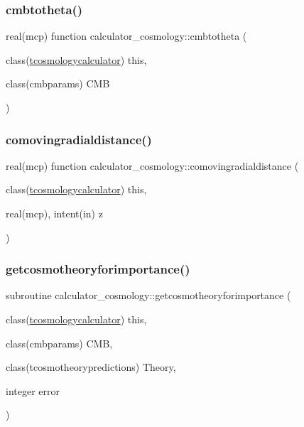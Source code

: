 \subsubsection{\texorpdfstring{cmbtotheta()}{cmbtotheta()}}
{\footnotesize\ttfamily real(mcp) function calculator\+\_\+cosmology\+::cmbtotheta (\begin{DoxyParamCaption}\item[{class(\mbox{\hyperlink{structcalculator__cosmology_1_1tcosmologycalculator}{tcosmologycalculator}})}]{this,  }\item[{class(cmbparams)}]{C\+MB }\end{DoxyParamCaption})\hspace{0.3cm}{\ttfamily [private]}}

\mbox{\label{namespacecalculator__cosmology_a56ce70cf463f7c6df9c6d59a9459b993}} 
\subsubsection{\texorpdfstring{comovingradialdistance()}{comovingradialdistance()}}
{\footnotesize\ttfamily real(mcp) function calculator\+\_\+cosmology\+::comovingradialdistance (\begin{DoxyParamCaption}\item[{class(\mbox{\hyperlink{structcalculator__cosmology_1_1tcosmologycalculator}{tcosmologycalculator}})}]{this,  }\item[{real(mcp), intent(in)}]{z }\end{DoxyParamCaption})\hspace{0.3cm}{\ttfamily [private]}}

\mbox{\label{namespacecalculator__cosmology_a520171f2409b797206b45a9b2f25ac22}} 
\subsubsection{\texorpdfstring{getcosmotheoryforimportance()}{getcosmotheoryforimportance()}}
{\footnotesize\ttfamily subroutine calculator\+\_\+cosmology\+::getcosmotheoryforimportance (\begin{DoxyParamCaption}\item[{class(\mbox{\hyperlink{structcalculator__cosmology_1_1tcosmologycalculator}{tcosmologycalculator}})}]{this,  }\item[{class(cmbparams)}]{C\+MB,  }\item[{class(tcosmotheorypredictions)}]{Theory,  }\item[{integer}]{error }\end{DoxyParamCaption})\hspace{0.3cm}{\ttfamily [private]}}

